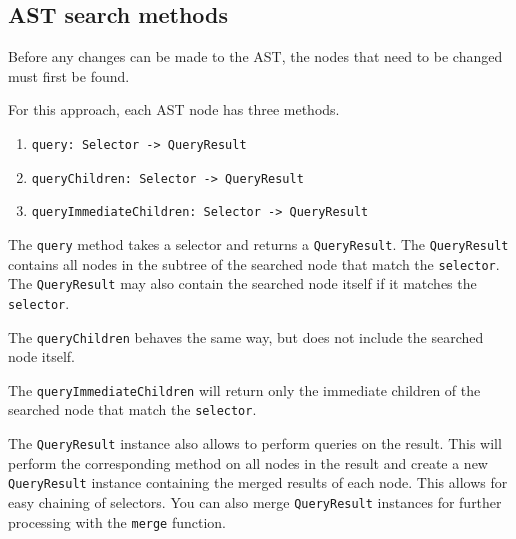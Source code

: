 
\subsection{AST search methods}

Before any changes can be made to the AST, the nodes that need to be changed must first be found.

For this approach, each AST node has three methods.

\begin{enumerate}
\item \verb|query: Selector -> QueryResult|
\item \verb|queryChildren: Selector -> QueryResult|
\item \verb|queryImmediateChildren: Selector -> QueryResult|
\end{enumerate}

The \verb|query| method takes a selector and returns a \verb|QueryResult|.
The \verb|QueryResult| contains all nodes in the subtree of the searched node that match the \verb|selector|. 
The \verb|QueryResult| may also contain the searched node itself if it matches the \verb|selector|.

The \verb|queryChildren| behaves the same way, but does not include the searched node itself.

The \verb|queryImmediateChildren| will return only the immediate children of the searched node that match the \verb|selector|.

The \verb|QueryResult| instance also allows to perform queries on the result. 
This will perform the corresponding method on all nodes in the result and create a new \verb|QueryResult| instance containing the merged results of each node. 
This allows for easy chaining of selectors. 
You can also merge \verb|QueryResult| instances for further processing with the \verb|merge| function.
